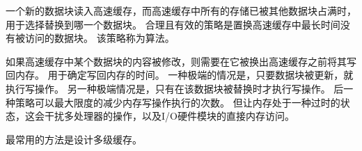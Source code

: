 {{        一个新的数据块读入高速缓存，而高速缓存中所有的存储已被其他数据块占满时，用于选择替换到哪一个数据块。
        合理且有效的策略是置换高速缓存中最长时间没有被访问的数据块。
        该策略称为算法。

        如果高速缓存中某个数据块的内容被修改，则需要在它被换出高速缓存之前将其写回内存。
        用于确定写回内存的时间。
        一种极端的情况是，只要数据块被更新，就执行写操作。
        另一种极端情况是，只有在该数据块被替换时才执行写操作。
        后一种策略可以最大限度的减少内存写操作执行的次数。
        但让内存处于一种过时的状态，这会干扰多处理器的操作，以及I/O硬件模块的直接内存访问。

        最常用的方法是设计多级缓存。
    }
}
